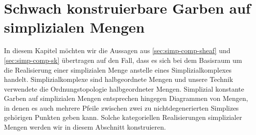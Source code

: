 
\chapter{Schwach konstruierbare Garben auf simplizialen Mengen}
\label{ch:simp-set-sk}

In diesem Kapitel möchten wir die Aussagen aus
\autoref{sec:simp-comp-sheaf} und \autoref{sec:simp-comp-sk}
übertragen auf den Fall, dass es sich bei dem Basisraum um die
Realisierung einer simplizialen Menge anstelle eines
Simplizialkomplexes handelt. Simplizialkomplexe sind halbgeordnete
Mengen und unsere Technik verwendete die Ordnungstopologie
halbgeordneter Mengen. Simplizial konstante Garben auf simplizialen
Mengen entsprechen hingegen Diagrammen von Mengen, in denen es auch
mehrere Pfeile zwischen zwei zu nichtdegenerierten Simplizes gehörigen
Punkten geben kann. Solche kategoriellen Realisierungen simplizialer
Mengen werden wir in diesem Abschnitt konstruieren.

